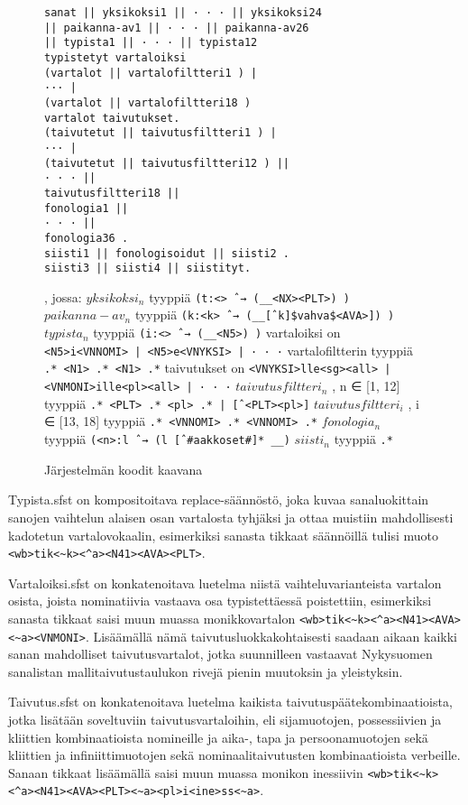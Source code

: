 \documentclass[free]{flammie}
\begin{document}
\begin{figure}
    \caption{Järjestelmän koodit kaavana}
    \begin{verbatim}
sanat || yksikoksi1 || · · · || yksikoksi24
|| paikanna-av1 || · · · || paikanna-av26
|| typista1 || · · · || typista12
typistetyt vartaloiksi
(vartalot || vartalofiltteri1 ) |
··· |
(vartalot || vartalofiltteri18 )
vartalot taivutukset.
(taivutetut || taivutusfiltteri1 ) |
··· |
(taivutetut || taivutusfiltteri12 ) ||
· · · ||
taivutusfiltteri18 ||
fonologia1 ||
· · · ||
fonologia36 .
siisti1 || fonologisoidut || siisti2 .
siisti3 || siisti4 || siistityt.\end{verbatim}
, jossa: $yksikoksi_n$ tyyppiä
\verb|(t:<> ˆ→ (__<NX><PLT>) )|
$paikanna-av_n$ tyyppiä
\verb|(k:<k> ˆ→ (__[ˆk]$vahva$<AVA>]) )|
$typista_n$ tyyppiä
\verb|(i:<> ˆ→ (__<N5>) )|
vartaloiksi on
\verb_<N5>i<VNNOMI> | <N5>e<VNYKSI> | · · ·_
vartalofiltterin tyyppiä
\verb_.* <N1> .* <N1> .*_
taivutukset on
\verb_<VNYKSI>lle<sg><all> | <VNMONI>ille<pl><all> | · · ·_
$taivutusfiltteri_n$ , n ∈ [1, 12] tyyppiä
\verb_.* <PLT> .* <pl> .* | [ˆ<PLT><pl>]_
$taivutusfiltteri_i$ , i ∈ [13, 18] tyyppiä
\verb_.* <VNNOMI> .* <VNNOMI> .*_
$fonologia_n$ tyyppiä
\verb|(<n>:l ˆ→ (l [ˆ#aakkoset#]* __)|
$siisti_n$ tyyppiä
\verb_.*_
\end{figure}

Typista.sfst on kompositoitava replace-säännöstö, joka kuvaa sanaluokittain
sanojen vaihtelun alaisen osan vartalosta tyhjäksi ja ottaa muistiin
mahdollisesti kadotetun vartalovokaalin, esimerkiksi sanasta tikkaat säännöillä
tulisi muoto \verb|<wb>tik<~k><^a><N41><AVA><PLT>|.

Vartaloiksi.sfst on konkatenoitava luetelma niistä vaihteluvarianteista vartalon
osista, joista nominatiivia vastaava osa typistettäessä poistettiin, esimerkiksi
sanasta tikkaat saisi muun muassa monikkovartalon
\verb|<wb>tik<~k><^a><N41><AVA><~a><VNMONI>|. Lisäämällä nämä taivutusluokkakohtaisesti
saadaan aikaan kaikki sanan mahdolliset taivutusvartalot, jotka suunnilleen
vastaavat Nykysuomen sanalistan mallitaivutustaulukon rivejä pienin muutoksin ja
yleistyksin.

Taivutus.sfst on konkatenoitava luetelma kaikista taivutuspäätekombinaatioista,
jotka lisätään soveltuviin taivutusvartaloihin, eli sijamuotojen, possessiivien
ja kliittien kombinaatioista nomineille ja aika-, tapa ja persoonamuotojen sekä
kliittien ja infiniittimuotojen sekä nominaalitaivutusten kombinaatioista
verbeille. Sanaan tikkaat lisäämällä saisi muun muassa monikon inessiivin
\verb|<wb>tik<~k><^a><N41><AVA><PLT><~a><pl>i<ine>ss<~a>|.
\end{document}
